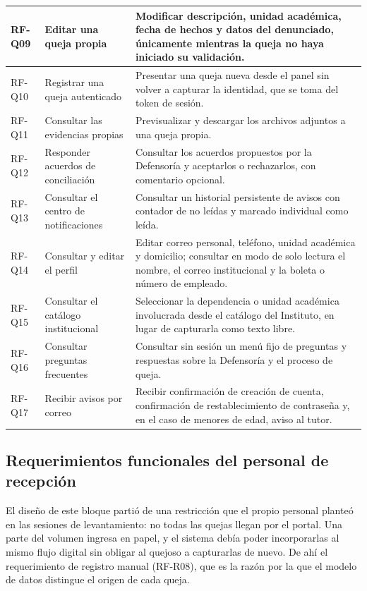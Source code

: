 \begin{longtable}{|p{1.5cm}|p{3.6cm}|p{9.0cm}|}
		RF-Q09 & Editar una queja propia & Modificar descripción, unidad académica, fecha de hechos
		y datos del denunciado, únicamente mientras la queja no haya iniciado su validación.
		\\ \hline
	
		RF-Q10 & Registrar una queja autenticado & Presentar una queja nueva desde el panel sin
		volver a capturar la identidad, que se toma del token de sesión. \\ \hline
	
		RF-Q11 & Consultar las evidencias propias & Previsualizar y descargar los archivos adjuntos
		a una queja propia. \\ \hline
	
		RF-Q12 & Responder acuerdos de conciliación & Consultar los acuerdos propuestos por la
		Defensoría y aceptarlos o rechazarlos, con comentario opcional. \\ \hline
	
		RF-Q13 & Consultar el centro de notificaciones & Consultar un historial persistente de
		avisos con contador de no leídas y marcado individual como leída. \\ \hline
	
		RF-Q14 & Consultar y editar el perfil & Editar correo personal, teléfono, unidad académica y
		domicilio; consultar en modo de solo lectura el nombre, el correo institucional y la boleta o
		número de empleado. \\ \hline
	
		RF-Q15 & Consultar el catálogo institucional & Seleccionar la dependencia o unidad académica
		involucrada desde el catálogo del Instituto, en lugar de capturarla como texto libre.
		\\ \hline
	
		RF-Q16 & Consultar preguntas frecuentes & Consultar sin sesión un menú fijo de preguntas y
		respuestas sobre la Defensoría y el proceso de queja. \\ \hline
	
		RF-Q17 & Recibir avisos por correo & Recibir confirmación de creación de cuenta, confirmación
		de restablecimiento de contraseña y, en el caso de menores de edad, aviso al tutor.
		\\ \hline
	\end{longtable}
	
	\normalsize
	
	\subsection{Requerimientos funcionales del personal de recepción}
	El diseño de este bloque partió de una restricción que el propio personal planteó en las
	sesiones de levantamiento: no todas las quejas llegan por el portal. Una parte del volumen
	ingresa en papel, y el sistema debía poder incorporarlas al mismo flujo digital sin obligar al
	quejoso a capturarlas de nuevo. De ahí el requerimiento de registro manual (RF-R08), que es la
	razón por la que el modelo de datos distingue el origen de cada queja.
	
